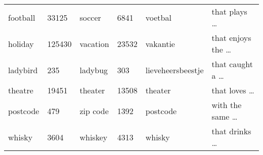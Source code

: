 \begin{minipage}[b]{0.99\textwidth}
\begin{tabular}{llllll}
    football & 33125 & soccer & 6841 & voetbal & that plays \dots \\
    holiday & 125430 & vacation & 23532 & vakantie & that enjoys the \dots \\
    ladybird & 235 & ladybug & 303 & lieveheersbeestje & that caught a \dots \\
    theatre & 19451 & theater & 13508 & theater & that loves \dots \\
    postcode & 479 & zip code & 1392 & postcode & with the same \dots \\
    whisky & 3604 & whiskey & 4313 & whisky & that drinks \dots \\
    \bottomrule
\end{tabular}
\label{tab:freqs_substitutivity_appendix}
\end{minipage}

